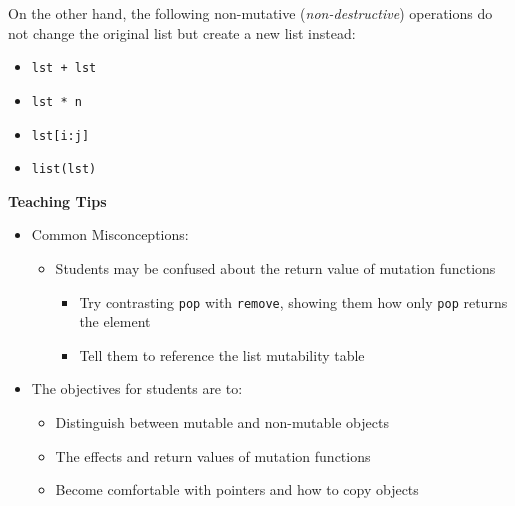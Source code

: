 \vspace{\parskip}

On the other hand, the following non-mutative (\emph{non-destructive}) operations do not change the original list but create a new list instead:

\begin{itemize}
\item \lstinline$lst + lst$
\item \lstinline$lst * n$
\item \lstinline$lst[i:j]$
\item \lstinline$list(lst)$
\end{itemize}

\begin{guide}
	\textbf{Teaching Tips}
	\begin{itemize}
			\item Common Misconceptions:
			\begin{itemize}
				\item Students may be confused about the return value of mutation functions
				\begin{itemize}
					\item Try contrasting \lstinline{pop} with \lstinline{remove}, showing them how only \lstinline{pop} returns the element
					\item Tell them to reference the list mutability table
				\end{itemize}
			\end{itemize}
			\item The objectives for students are to:
			\begin{itemize}
				\item Distinguish between mutable and non-mutable objects
				\item The effects and return values of mutation functions
				\item Become comfortable with pointers and how to copy objects
			\end{itemize}
	\end{itemize}
\end{guide}
